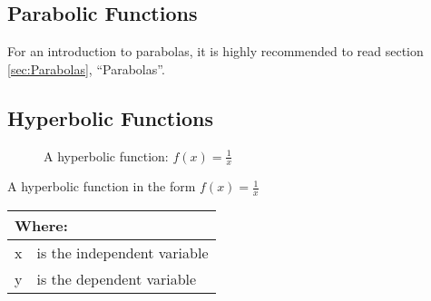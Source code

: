 \subsection{Parabolic Functions}
\label{sec:ParabolicFunctions}
For an introduction to parabolas, it is highly recommended to read section
\ref{sec:Parabolas}, ``Parabolas''.
\clearpage
\subsection{Hyperbolic Functions}
\begin{figure}[!htb]
\label{fig:FuncGraphHyperbola}
\caption{A hyperbolic function: $f(x) = \frac{1}{x}$}
\end{figure}
A hyperbolic function in the form $ f(x) = \frac{1}{x}$
\begin{table}[!hbt]
\label{tab:PartsOfAHyperbolicFunction}
\begin{tabularx}{\linewidth}{| l X |}
  \hline
  \multicolumn{2}{|l|}{Where:} \\
  \hline \hline
  x & is the independent variable\\
  y & is the dependent variable\\
\hline
\end{tabularx}
\end{table}
%
\clearpage
